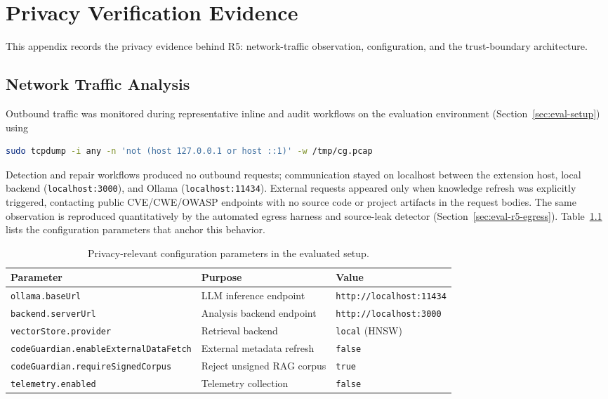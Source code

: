 \chapter{Privacy Verification Evidence}
\label{app:privacy-verification}

This appendix records the privacy evidence behind R5: network-traffic observation, configuration, and the trust-boundary architecture.

\section{Network Traffic Analysis}
\label{sec:privacy-network-analysis}

Outbound traffic was monitored during representative inline and audit workflows on the evaluation environment (Section~\ref{sec:eval-setup}) using
\begin{lstlisting}[language=bash]
sudo tcpdump -i any -n 'not (host 127.0.0.1 or host ::1)' -w /tmp/cg.pcap
\end{lstlisting}
Detection and repair workflows produced no outbound requests; communication stayed on localhost between the extension host, local backend (\texttt{localhost:3000}), and Ollama (\texttt{localhost:11434}). External requests appeared only when knowledge refresh was explicitly triggered, contacting public CVE/CWE/OWASP endpoints with no source code or project artifacts in the request bodies. The same observation is reproduced quantitatively by the automated egress harness and source-leak detector (Section~\ref{sec:eval-r5-egress}). Table~\ref{tab:privacy-config} lists the configuration parameters that anchor this behavior.

\begin{table}[H]
  \centering
  \caption{Privacy-relevant configuration parameters in the evaluated setup.}
  \label{tab:privacy-config}
  \small
  \begin{tabularx}{\textwidth}{lXl}
    \toprule
    Parameter & Purpose & Value \\
    \midrule
    \texttt{ollama.baseUrl} & LLM inference endpoint & \texttt{http://localhost:11434} \\
    \texttt{backend.serverUrl} & Analysis backend endpoint & \texttt{http://localhost:3000} \\
    \texttt{vectorStore.provider} & Retrieval backend & \texttt{local} (HNSW) \\
    \texttt{codeGuardian.enableExternalDataFetch} & External metadata refresh & \texttt{false} \\
    \texttt{codeGuardian.requireSignedCorpus} & Reject unsigned RAG corpus & \texttt{true} \\
    \texttt{telemetry.enabled} & Telemetry collection & \texttt{false} \\
    \bottomrule
  \end{tabularx}
\end{table}

